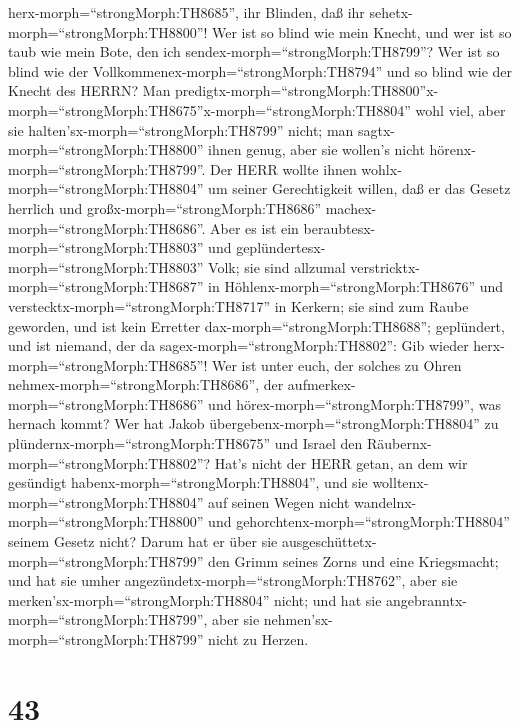 herx-morph=``strongMorph:TH8685'', ihr Blinden, daß ihr
sehetx-morph=``strongMorph:TH8800''!  Wer ist so blind wie
mein Knecht, und wer ist so taub wie mein Bote, den ich
sendex-morph=``strongMorph:TH8799''? Wer ist so blind wie der
Vollkommenex-morph=``strongMorph:TH8794'' und so blind wie der Knecht
des HERRN?  Man
predigtx-morph=``strongMorph:TH8800''\textbar x-morph=``strongMorph:TH8675''x-morph=``strongMorph:TH8804''
wohl viel, aber sie halten'sx-morph=``strongMorph:TH8799'' nicht; man
sagtx-morph=``strongMorph:TH8800'' ihnen genug, aber sie wollen's nicht
hörenx-morph=``strongMorph:TH8799''.  Der HERR wollte ihnen
wohlx-morph=``strongMorph:TH8804'' um seiner Gerechtigkeit willen, daß
er das Gesetz herrlich und großx-morph=``strongMorph:TH8686''
machex-morph=``strongMorph:TH8686''.  Aber es ist ein
beraubtesx-morph=``strongMorph:TH8803'' und
geplündertesx-morph=``strongMorph:TH8803'' Volk; sie sind allzumal
verstricktx-morph=``strongMorph:TH8687'' in
Höhlenx-morph=``strongMorph:TH8676'' und
verstecktx-morph=``strongMorph:TH8717'' in Kerkern; sie sind zum Raube
geworden, und ist kein Erretter dax-morph=``strongMorph:TH8688'';
geplündert, und ist niemand, der da sagex-morph=``strongMorph:TH8802'':
Gib wieder herx-morph=``strongMorph:TH8685''!  Wer ist
unter euch, der solches zu Ohren nehmex-morph=``strongMorph:TH8686'',
der aufmerkex-morph=``strongMorph:TH8686'' und
hörex-morph=``strongMorph:TH8799'', was hernach kommt?  Wer
hat Jakob übergebenx-morph=``strongMorph:TH8804'' zu
plündernx-morph=``strongMorph:TH8675'' und Israel den
Räubernx-morph=``strongMorph:TH8802''? Hat's nicht der HERR getan, an
dem wir gesündigt habenx-morph=``strongMorph:TH8804'', und sie
wolltenx-morph=``strongMorph:TH8804'' auf seinen Wegen nicht
wandelnx-morph=``strongMorph:TH8800'' und
gehorchtenx-morph=``strongMorph:TH8804'' seinem Gesetz nicht?
 Darum hat er über sie
ausgeschüttetx-morph=``strongMorph:TH8799'' den Grimm seines Zorns und
eine Kriegsmacht; und hat sie umher
angezündetx-morph=``strongMorph:TH8762'', aber sie
merken'sx-morph=``strongMorph:TH8804'' nicht; und hat sie
angebranntx-morph=``strongMorph:TH8799'', aber sie
nehmen'sx-morph=``strongMorph:TH8799'' nicht zu Herzen.

\hypertarget{section-42}{%
\section{43}\label{section-42}}

